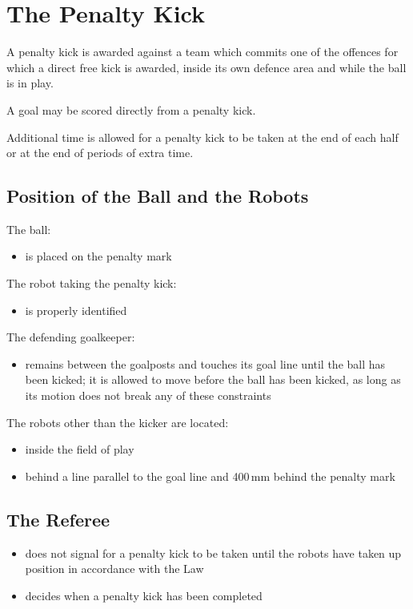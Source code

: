 \section{The Penalty Kick}\label{sec:penalty-kick}

A penalty kick is awarded against a team which commits one of the offences for which a direct free kick is awarded, inside its own defence area and while the ball is in play.

A goal may be scored directly from a penalty kick.

Additional time is allowed for a penalty kick to be taken at the end of each half or at the end of periods of extra time.

\subsection{Position of the Ball and the Robots}
The ball:

\begin{itemize}
\item is placed on the penalty mark
\end{itemize}

The robot taking the penalty kick:

\begin{itemize}
\item is properly identified
\end{itemize}

The defending goalkeeper:

\begin{itemize}
\item remains between the goalposts and touches its goal line until the ball has been kicked; it is allowed to move before the ball has been kicked, as long as its motion does not break any of these constraints
\end{itemize}

The robots other than the kicker are located:

\begin{itemize}
\item inside the field of play
\item behind a line parallel to the goal line and 400\,mm behind the penalty mark
\end{itemize}

\subsection{The Referee}
\begin{itemize}
\item does not signal for a penalty kick to be taken until the robots have taken up position in accordance with the Law
\item decides when a penalty kick has been completed
\end{itemize}

